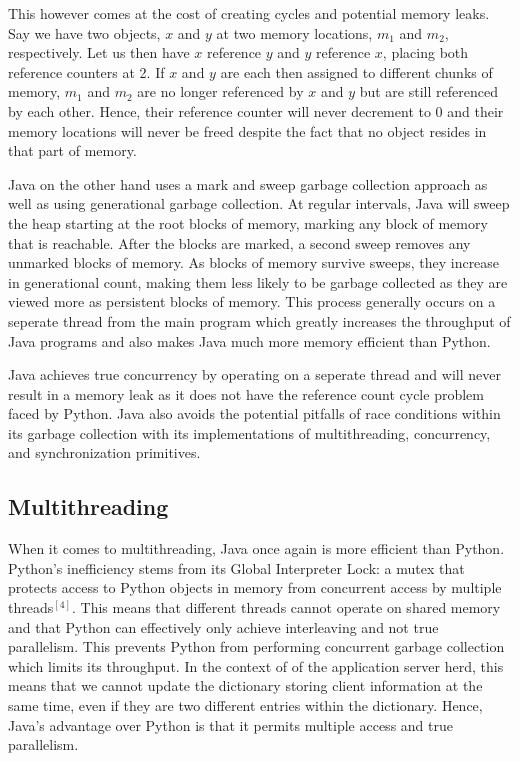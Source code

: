 This however comes at the cost of creating cycles and potential memory leaks. Say we have two objects, $x$ and $y$ at two memory locations, $m_1$ and $m_2$, respectively. Let us then have $x$ reference $y$ and $y$ reference $x$, placing both reference counters at 2. If $x$ and $y$ are each then assigned to different chunks of memory, $m_1$ and $m_2$ are no longer referenced by $x$ and $y$ but are still referenced by each other. Hence, their reference counter will never decrement to 0 and their memory locations will never be freed despite the fact that no object resides in that part of memory.

Java on the other hand uses a mark and sweep garbage collection approach as well as using generational garbage collection. At regular intervals, Java will sweep the heap starting at the root blocks of memory, marking any block of memory that is reachable. After the blocks are marked, a second sweep removes any unmarked blocks of memory. As blocks of memory survive sweeps, they increase in generational count, making them less likely to be garbage collected as they are viewed more as persistent blocks of memory. This process generally occurs on a seperate thread from the main program which greatly increases the throughput of Java programs and also makes Java much more memory efficient than Python.

Java achieves true concurrency by operating on a seperate thread and will never result in a memory leak as it does not have the reference count cycle problem faced by Python. Java also avoids the potential pitfalls of race conditions within its garbage collection with its implementations of multithreading, concurrency, and synchronization primitives.

\subsection{Multithreading}

When it comes to multithreading, Java once again is more efficient than Python. Python's inefficiency stems from its Global Interpreter Lock: a mutex that protects access to Python objects in memory from concurrent access by multiple threads$^{[4]}$. This means that different threads cannot operate on shared memory and that Python can effectively only achieve interleaving and not true parallelism. This prevents Python from performing concurrent garbage collection which limits its throughput. In the context of of the application server herd, this means that we cannot update the dictionary storing client information at the same time, even if they are two different entries within the dictionary. Hence, Java's advantage over Python is that it permits multiple access and true parallelism.

